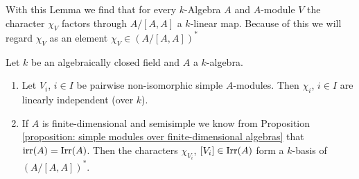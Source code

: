 With this Lemma we find that for every $k$-Algebra $A$ and $A$-module $V$ the character $\chi_V$ factors through $A/[A,A]$ a $k$-linear map.
Because of this we will regard $\chi_V$ as an element $\chi_V \in (A/[A,A])^*$


\begin{theorem} \label{theorem: characters as a basis}
  Let $k$ be an algebraically closed field and $A$ a $k$-algebra.
  \begin{enumerate}[label=\emph{\alph*)},leftmargin=*]
    \item
      Let $V_i$, $i \in I$ be pairwise non-isomorphic simple $A$-modules.
      Then $\chi_i$, $i \in I$ are linearly independent (over $k$).
    \item
      If $A$ is finite-dimensional and semisimple we know from Proposition \ref{proposition: simple modules over finite-dimensional algebras} that $\operatorname{irr}(A) = \operatorname{Irr}(A)$.
      Then the characters $\chi_{V_i}$, $[V_i] \in \operatorname{Irr}(A)$ form a $k$-basis of $(A/[A,A])^*$.
  \end{enumerate}
\end{theorem}
